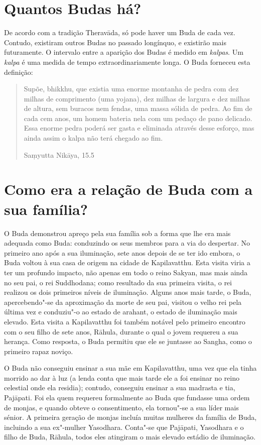 \section{Quantos Budas há?}

De acordo com a tradição Theravāda, só pode haver um Buda de cada vez.
Contudo, existiram outros Budas no passado longínquo, e existirão mais
futuramente. O intervalo entre a aparição dos Budas é medido em
\emph{kalpas}. Um \emph{kalpa} é uma medida de tempo extraordinariamente
longa. O Buda forneceu esta definição:

\begin{verse}
Supõe, bhikkhu, que existia uma enorme montanha de pedra com
dez milhas de comprimento (uma yojana), dez milhas de largura e dez
milhas de altura, sem buracos nem fendas, uma massa sólida de pedra. Ao
fim de cada cem anos, um homem bateria nela com um pedaço de pano
delicado. Essa enorme pedra poderá ser gasta e eliminada através desse
esforço, mas ainda assim o kalpa não terá chegado ao fim.

{\raggedleft
  Saṃyutta Nikāya, 15.5
\par}
\end{verse}

\section{Como era a relação de Buda com a sua família?}

O Buda demonstrou apreço pela sua família sob a forma que lhe era mais
adequada como Buda: conduzindo os seus membros para a via do despertar.
No primeiro ano após a sua iluminação, sete anos depois de se ter ido
embora, o Buda voltou à sua casa de origem na cidade de Kapilavatthu.
Esta visita viria a ter um profundo impacto, não apenas em todo o reino
Sakyan, mas mais ainda no seu pai, o rei Suddhodana; como resultado da
sua primeira visita, o rei realizou os dois primeiros níveis de
iluminação. Alguns anos mais tarde, o Buda, apercebendo"-se da aproximação
da morte de seu pai, visitou o velho rei pela última vez e conduziu"-o ao
estado de arahant, o estado de iluminação mais elevado. Esta visita a
Kapilavatthu foi também notável pelo primeiro encontro com o seu filho
de sete anos, Rāhula, durante o qual o jovem requereu a sua herança.
Como resposta, o Buda permitiu que ele se juntasse ao Sangha, como o
primeiro rapaz noviço.

O Buda não conseguiu ensinar a sua mãe em Kapilavatthu, uma vez que ela
tinha morrido ao dar à luz (a lenda conta que mais tarde ele a foi
ensinar no reino celestial onde ela residia); contudo, conseguiu ensinar
a sua madrasta e tia, Pajāpati. Foi ela quem requereu formalmente ao
Buda que fundasse uma ordem de monjas, e quando obteve o consentimento,
ela tornou"-se a sua líder mais sénior. A primeira geração de monjas
incluía muitas mulheres da família de Buda, incluindo a sua ex"-mulher
Yasodhara. Conta"-se que Pajāpati, Yasodhara e o filho de Buda, Rāhula,
todos eles atingiram o mais elevado estádio de iluminação.

